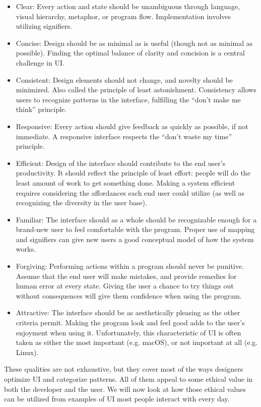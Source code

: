 \documentclass[12pt, oneside]{article}
\begin{document}
\begin{itemize}
\raggedright
    \item Clear: Every action and state should be unambiguous through language, visual hierarchy, metaphor, or program flow. Implementation involves utilizing signifiers.
    \item Concise: Design should be as minimal as is useful (though not as minimal as possible). Finding the optimal balance of clarity and concision is a central challenge in UI.
    \item Consistent: Design elements should not change, and novelty should be minimized. Also called the principle of least astonishment. Consistency allows users to recognize patterns in the interface, fulfilling the ``don't make me think'' principle.
    \item Responsive: Every action should give feedback as quickly as possible, if not immediate. A responsive interface respects the ``don't waste my time'' principle.
    \item Efficient: Design of the interface should contribute to the end user's productivity. It should reflect the principle of least effort: people will do the least amount of work to get something done. Making a system efficient requires considering the affordances each end user could utilize (as well as recognizing the diversity in the user base).
    \item Familiar: The interface should as a whole should be recognizable enough for a brand-new user to feel comfortable with the program. Proper use of mapping and signifiers can give new users a good conceptual model of how the system works.
    \item Forgiving: Performing actions within a program should never be punitive. Assume that the end user will make mistakes, and provide remedies for human error at every state. Giving the user a chance to try things out without consequences will give them confidence when using the program.
    \item Attractive: The interface should be as aesthetically pleasing as the other criteria permit. Making the program look and feel good adds to the user's enjoyment when using it. Unfortunately, this characteristic of UI is often taken as either the most important (e.g. macOS), or not important at all (e.g. Linux).
\end{itemize}

These qualities are not exhaustive, but they cover most of the ways designers optimize UI and categorize patterns. All of them appeal to some ethical value in both the developer and the user. We will now look at how those ethical values can be utilized from examples of UI most people interact with every day.
\end{document}
